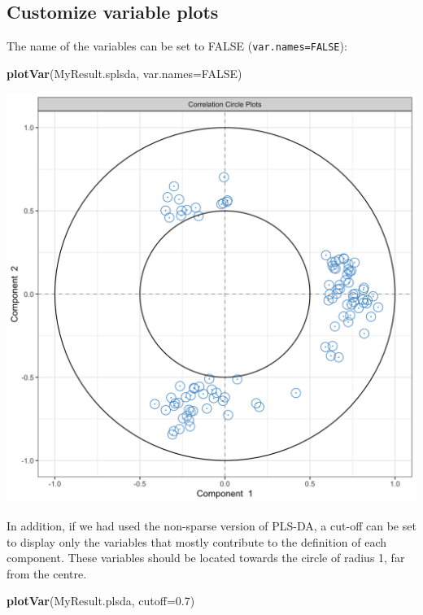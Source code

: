 \documentclass[]{book}
\newenvironment{Shaded}{\begin{snugshade}}{\end{snugshade}}
\newcommand{\DataTypeTok}[1]{\textcolor[rgb]{0.13,0.29,0.53}{#1}}
\newcommand{\FloatTok}[1]{\textcolor[rgb]{0.00,0.00,0.81}{#1}}
\newcommand{\KeywordTok}[1]{\textcolor[rgb]{0.13,0.29,0.53}{\textbf{#1}}}
\newcommand{\NormalTok}[1]{#1}
\newcommand{\OtherTok}[1]{\textcolor[rgb]{0.56,0.35,0.01}{#1}}
\begin{document}
\hypertarget{customize-variable-plots}{%
\subsection{Customize variable plots}\label{customize-variable-plots}}

The name of the variables can be set to FALSE (\texttt{var.names=FALSE}):

\begin{Shaded}
\begin{Highlighting}[]
\KeywordTok{plotVar}\NormalTok{(MyResult.splsda, }\DataTypeTok{var.names=}\OtherTok{FALSE}\NormalTok{)}
\end{Highlighting}
\end{Shaded}

\begin{center}\includegraphics[width=0.75\linewidth,]{Figures/04-plsda-plotVar-1} \end{center}

In addition, if we had used the non-sparse version of PLS-DA, a cut-off can be set to display only the variables that mostly contribute to the definition of each component. These variables should be located towards the circle of radius 1, far from the centre.

\begin{Shaded}
\begin{Highlighting}[]
\KeywordTok{plotVar}\NormalTok{(MyResult.plsda, }\DataTypeTok{cutoff=}\FloatTok{0.7}\NormalTok{)}
\end{Highlighting}
\end{Shaded}
\end{document}
